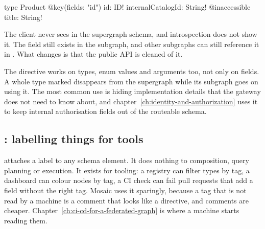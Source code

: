 \begin{graphqlsdl}
type Product @key(fields: "id") {
  id: ID!
  internalCatalogId: String! @inaccessible
  title: String!
}
\end{graphqlsdl}

The client never sees  in the supergraph schema, and
introspection does not show it. The field still exists in the subgraph, and
other subgraphs can still reference it in . What changes is
that the public API is cleaned of it.

%
The directive works on types, enum values and arguments too, not only on fields.
A whole type marked  disappears from the supergraph while
its subgraph goes on using it. The most common use is hiding implementation
details that the gateway does not need to know about, and
chapter~\ref{ch:identity-and-authorization} uses it to keep internal
authorisation fields out of the routeable schema.

\subsection*{: labelling things for tools}

%
 attaches a label to any schema element. It does
nothing to composition, query planning or execution. It exists for tooling: a
registry can filter types by tag, a dashboard can colour nodes by tag, a CI
check can fail pull requests that add a field without the right tag. Mosaic uses
it sparingly, because a tag that is not read by a machine is a comment that
looks like a directive, and comments are cheaper. Chapter~\ref{ch:ci-cd-for-a-federated-graph}
is where a machine starts reading them.

%
